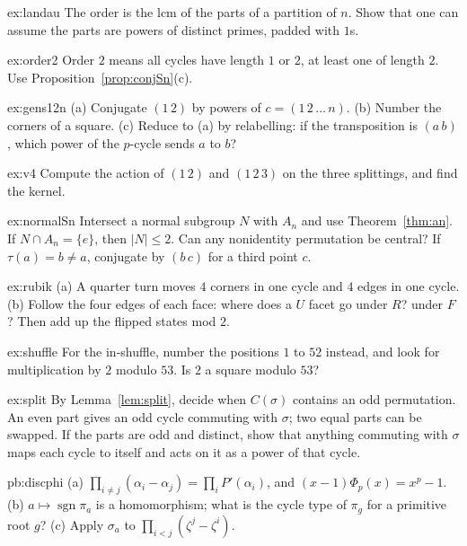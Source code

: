 \begin{hint}{ex:landau}
The order is the lcm of the parts of a partition of $n$. Show that one can assume the parts are powers of distinct primes, padded with $1$s.
\end{hint}
\begin{hint}{ex:order2}
Order $2$ means all cycles have length $1$ or $2$, at least one of length $2$. Use Proposition~\ref{prop:conjSn}(c).
\end{hint}
\begin{hint}{ex:gens12n}
(a) Conjugate $(1\,2)$ by powers of $c=(1\,2\,\dots\,n)$. (b) Number the corners of a square. (c) Reduce to (a) by relabelling: if the transposition is $(a\,b)$, which power of the $p$-cycle sends $a$ to $b$?
\end{hint}
\begin{hint}{ex:v4}
Compute the action of $(1\,2)$ and $(1\,2\,3)$ on the three splittings, and find the kernel.
\end{hint}
\begin{hint}{ex:normalSn}
Intersect a normal subgroup $N$ with $A_n$ and use Theorem~\ref{thm:an}. If $N\cap A_n=\{e\}$, then $|N|\le2$. Can any nonidentity permutation be central? If $\tau(a)=b\ne a$, conjugate by $(b\,c)$ for a third point $c$.
\end{hint}
\begin{hint}{ex:rubik}
(a) A quarter turn moves $4$ corners in one cycle and $4$ edges in one cycle. (b) Follow the four edges of each face: where does a $U$ facet go under $R$? under $F$? Then add up the flipped states mod $2$.
\end{hint}
\begin{hint}{ex:shuffle}
For the in-shuffle, number the positions $1$ to $52$ instead, and look for multiplication by $2$ modulo $53$. Is $2$ a square modulo $53$?
\end{hint}
\begin{hint}{ex:split}
By Lemma~\ref{lem:split}, decide when $C(\sigma)$ contains an odd permutation. An even part gives an odd cycle commuting with $\sigma$; two equal parts can be swapped. If the parts are odd and distinct, show that anything commuting with $\sigma$ maps each cycle to itself and acts on it as a power of that cycle.
\end{hint}

\begin{hint}{pb:discphi}
(a) $\prod_{i\ne j}(\alpha_i-\alpha_j)=\prod_iP'(\alpha_i)$, and $(x-1)\Phi_p(x)=x^p-1$. (b) $a\mapsto\operatorname{sgn}\pi_a$
is a homomorphism; what is the cycle type of $\pi_g$ for a primitive root $g$? (c) Apply $\sigma_a$ to
$\prod_{i<j}(\zeta^j-\zeta^i)$.
\end{hint}

